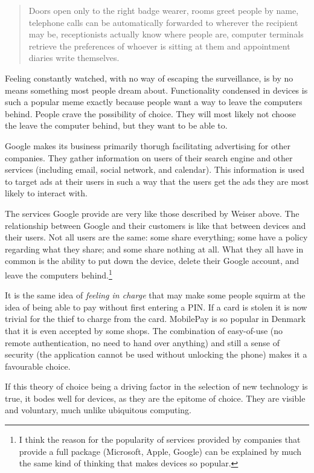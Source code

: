 \begin{quote}
    Doors open only to the right badge wearer, rooms greet people by name, telephone calls can be automatically forwarded to
    wherever the recipient may be, receptionists actually know where people are, computer terminals retrieve the preferences
    of whoever is sitting at them and appointment diaries write themselves.\cite{weiser91}
\end{quote}

Feeling constantly watched, with no way of escaping the surveillance, is by no means something most people dream about.
Functionality condensed in devices is such a popular meme exactly because people want a way to leave the computers behind.
People crave the possibility of choice. They will most likely not choose the leave the computer behind, but they want to
be able to.

Google makes its business primarily thorugh facilitating advertising for other companies. They gather information on users of
their search engine and other services (including email, social network, and calendar). This information is used to target ads
at their users in such a way that the users get the ads they are most likely to interact with.

The services Google provide are very like those described by Weiser above. The relationship between Google and their customers
is like that between devices and their users. Not all users are the same: some share everything; some have a policy regarding
what they share; and some share nothing at all. What they all have in common is the ability to put down the device, delete their
Google account, and leave the computers behind.\footnote{I think the reason for the popularity of services provided by companies
that provide a full package (Microsoft, Apple, Google) can be explained by much the same kind of thinking that makes devices so
popular.}

It is the same idea of \emph{feeling in charge} that may make some people squirm at the idea of being able to pay without first
entering a PIN. If a card is stolen it is now trivial for the thief to charge from the card. MobilePay is so popular in Denmark
that it is even accepted by some shops. The combination of easy-of-use (no remote authentication, no need to hand over anything)
and still a sense of security (the application cannot be used without unlocking the phone) makes it a favourable choice.

If this theory of choice being a driving factor in the selection of new technology is true, it bodes well for devices, as they
are the epitome of choice. They are visible and voluntary, much unlike ubiquitous computing.